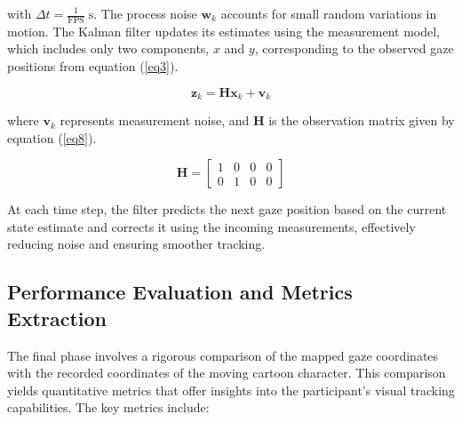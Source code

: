 \documentclass[10pt,a4paper,twoside]{article}
\begin{document}
with \( \Delta t = \frac{1}{\text{FPS}} \;\text{s} \). The process noise \( \mathbf{w}_k \) accounts for small random variations in motion. The Kalman filter updates its estimates using the measurement model, which includes only two components, \( x \) and \( y \), corresponding to the observed gaze positions from equation (\ref{eq3}).

\begin{equation}
\label{eq7}
\mathbf{z}_k = \mathbf{H} \mathbf{x}_k + \mathbf{v}_k
\end{equation}

where \( \mathbf{v}_k \) represents measurement noise, and \( \mathbf{H} \) is the observation matrix given by equation (\ref{eq8}).

\begin{equation}
\label{eq8}
\mathbf{H} =
\begin{bmatrix}
1 & 0 & 0 & 0 \\
0 & 1 & 0 & 0
\end{bmatrix}
\end{equation}

At each time step, the filter predicts the next gaze position based on the current state estimate and corrects it using the incoming measurements, effectively reducing noise and ensuring smoother tracking.

\subsection{Performance Evaluation and Metrics Extraction}
\label{perf}

The final phase involves a rigorous comparison of the mapped gaze coordinates with the recorded coordinates of the moving cartoon character. This comparison yields quantitative metrics that offer insights into the participant’s visual tracking capabilities. The key metrics include:
\end{document}
